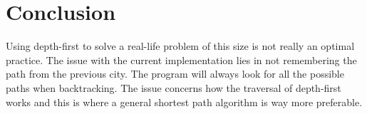 \documentclass[a4paper,11pt]{article}
\begin{document}
\section*{Conclusion}

    Using depth-first to solve a real-life problem of this size is not really an optimal practice. The issue with the current implementation lies in not remembering the path from the previous city. The program will always look for all the possible paths when backtracking. The issue concerns how the traversal of depth-first works and this is where a general shortest path algorithm is way more preferable.
    
    
\end{document}
